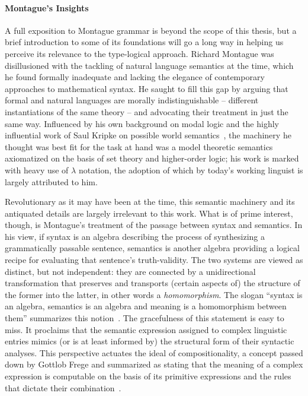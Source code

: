 \paragraph{Montague's Insights}
A full exposition to Montague grammar is beyond the scope of this thesis, but a brief introduction to some of its foundations will go a long way in helping us perceive its relevance to the type-logical approach.
Richard Montague was disillusioned with the tackling of natural language semantics at the time, which he found formally inadequate and lacking the elegance of contemporary approaches to mathematical syntax.
He saught to fill this gap by arguing that formal and natural languages are morally indistinguishable -- different instantiations of the same theory -- and advocating their treatment in just the same way.
Influenced by his own background on modal logic and the highly influential work of Saul Kripke on possible world semantics~\cite{kripke1963semantical}, the machinery he thought was best fit for the task at hand was a model theoretic semantics axiomatized on the basis of set theory and higher-order logic; his work is marked with heavy use of $\lambda$ notation, the adoption of which by today's working linguist is largely attributed to him.

Revolutionary as it may have been at the time, this semantic machinery and its antiquated details are largely irrelevant to this work.
What is of prime interest, though, is Montague's treatment of the passage between syntax and semantics.
In his view, if syntax is an algebra describing the process of synthesizing a grammatically passable sentence, semantics is another algebra providing a logical recipe for evaluating that sentence's truth-validity.
The two systems are viewed as distinct, but not independent: they are connected by a unidirectional transformation that preserves and transports (certain aspects of) the structure of the former into the latter, in other words a \textit{homomorphism}.
The slogan ``syntax is an algebra, semantics is an algebra and meaning is a homomorphism between them'' summarizes this notion~\cite{janssen2014foundations}.
The gracefulness of this statement is easy to miss. 
It proclaims that the semantic expression assigned to complex linguistic entries mimics (or is at least informed by) the structural form of their syntactic analyses.
This perspective actuates the ideal of compositionality, a concept passed down by Gottlob Frege and summarized as stating that the meaning of a complex expression is computable on the basis of its primitive expressions and the rules that dictate their combination~\cite{partee1984compositionality}.

